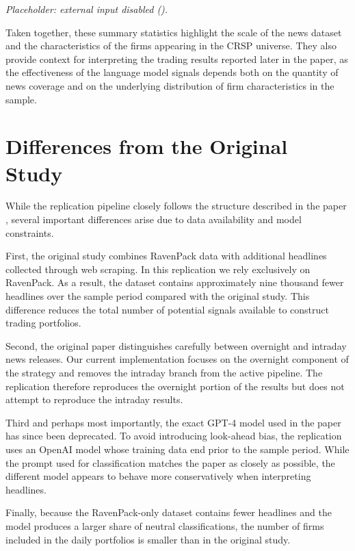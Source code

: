 \documentclass[12pt]{article}
\newif\ifuseexternalassets
\newcommand{\safeinputorplaceholder}[1]{%
  \ifuseexternalassets
    \IfFileExists{#1}{}{\emph{Placeholder: \texttt{\detokenize{#1}} not found.}}%
  \else
    \emph{Placeholder: external input disabled (\texttt{\detokenize{#1}}).}%
  \fi
}
\begin{document}
\begin{table}[H]
\centering
\caption{Distribution of News by Release Timing}
\label{tab:news_timing}
\safeinputorplaceholder{../_output/summary_stats_news_by_timing.tex}
\end{table}

Taken together, these summary statistics highlight the scale of the news dataset and the characteristics of the firms appearing in the CRSP universe. They also provide context for interpreting the trading results reported later in the paper, as the effectiveness of the language model signals depends both on the quantity of news coverage and on the underlying distribution of firm characteristics in the sample.



\section{Differences from the Original Study}

While the replication pipeline closely follows the structure described in the paper \cite{LopezLiraTang2023}, several important differences arise due to data availability and model constraints.

First, the original study combines RavenPack data with additional headlines collected through web scraping. In this replication we rely exclusively on RavenPack. As a result, the dataset contains approximately nine thousand fewer headlines over the sample period compared with the original study. This difference reduces the total number of potential signals available to construct trading portfolios.

Second, the original paper distinguishes carefully between overnight and intraday news releases. Our current implementation focuses on the overnight component of the strategy and removes the intraday branch from the active pipeline. The replication therefore reproduces the overnight portion of the results but does not attempt to reproduce the intraday results.

Third and perhaps most importantly, the exact GPT-4 model used in the paper has since been deprecated. To avoid introducing look-ahead bias, the replication uses an OpenAI model whose training data end prior to the sample period. While the prompt used for classification matches the paper as closely as possible, the different model appears to behave more conservatively when interpreting headlines.

Finally, because the RavenPack-only dataset contains fewer headlines and the model produces a larger share of neutral classifications, the number of firms included in the daily portfolios is smaller than in the original study.
\end{document}

